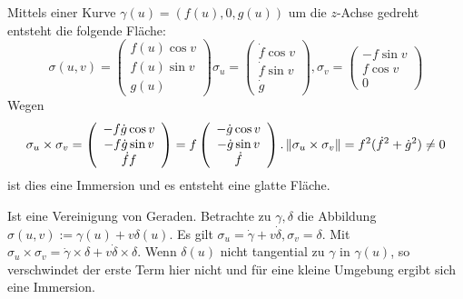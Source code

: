 \documentclass[11pt]{article}
\begin{document}
\begin{example}[Drehflächen] Mittels einer Kurve $\gamma(u) = (f(u), 0, g(u))$ um die $z$-Achse gedreht entsteht die folgende Fläche: \begin{equation*}
    \sigma(u,v) = \left(\begin{array}{c}
         f(u)\cos v \\ f(u)\sin v\\g(u) 
    \end{array}\right) \sigma_u = \left(\begin{array}{c}
         \dot f \cos v\\\dot f \sin v\\ \dot g
    \end{array}\right), \sigma_v = \left(\begin{array}{c}
         -f\sin v\\f\cos v\\ 0
    \end{array}\right)
\end{equation*}
Wegen \begin{equation*}
    \sigma_u\times \sigma_v = \left(\begin{array}{c}
         -f\dot g \cos v\\ -f\dot g \sin v\\ \dot f f
    \end{array}\right) = f\left(\begin{array}{c}
         - \dot g \cos v\\ -\dot g\sin v\\ \dot f
    \end{array}\right).\left\lVert\sigma_u\times\sigma_v\right\rVert = f^2(\dot f^2+ \dot g^2) \neq 0
\end{equation*}
ist dies eine Immersion und es entsteht eine glatte Fläche.
\end{example}
\begin{example}[Regelflächen]
Ist eine Vereinigung von Geraden. Betrachte zu $\gamma,\delta$ die Abbildung $\sigma(u,v) := \gamma(u) + v\delta(u)$. Es gilt $\sigma_u = \dot\gamma+v\dot\delta, \sigma_v = \delta$. Mit $\sigma_u\times \sigma_v = \dot\gamma\times \delta + v\dot\delta\times \delta$. Wenn $\delta(u)$ nicht tangential zu $\gamma$ in $\gamma(u)$, so verschwindet der erste Term hier nicht und für eine kleine Umgebung ergibt sich eine Immersion. 
\end{example}
\end{document}
